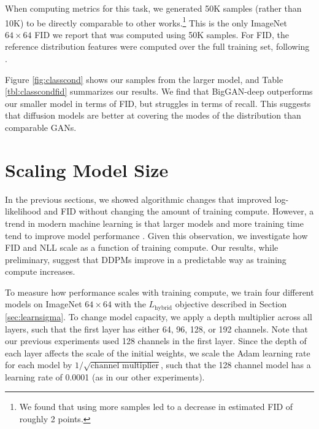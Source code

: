 \documentclass{article}
\begin{document}
When computing metrics for this task, we generated 50K samples (rather than 10K) to be directly comparable to other works.\footnote{We found that using more samples led to a decrease in estimated FID of roughly 2 points.} This is the only ImageNet $64 \times 64$ FID we report that was computed using 50K samples. For FID, the reference distribution features were computed over the full training set, following \cite{biggan}.

Figure \ref{fig:classcond} shows our samples from the larger model, and Table \ref{tbl:classcondfid} summarizes our results. We find that BigGAN-deep outperforms our smaller model in terms of FID, but struggles in terms of recall. This suggests that diffusion models are better at covering the modes of the distribution than comparable GANs.

\section{Scaling Model Size}
\label{sec:scaling}

In the previous sections, we showed algorithmic changes that improved log-likelihood and FID without changing the amount of training compute. However, a trend in modern machine learning is that larger models and more training time tend to improve model performance \citep{scalinglaws,igpt,gpt3}. Given this observation, we investigate how FID and NLL scale as a function of training compute. Our results, while preliminary, suggest that DDPMs improve in a predictable way as training compute increases.

To measure how performance scales with training compute, we train four different models on ImageNet $64 \times 64$ with the $L_{\text{hybrid}}$ objective described in Section \ref{sec:learnsigma}. To change model capacity, we apply a depth multiplier across all layers, such that the first layer has either 64, 96, 128, or 192 channels. Note that our previous experiments used 128 channels in the first layer. Since the depth of each layer affects the scale of the initial weights, we scale the Adam \citep{adam} learning rate for each model by $1/\sqrt{\text{channel multiplier}}$, such that the 128 channel model has a learning rate of 0.0001 (as in our other experiments).
\end{document}

